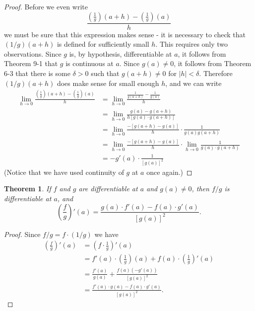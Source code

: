 \documentclass{article}
\newtheorem{theorem}{Theorem}
\begin{document}
\begin{proof}
  Before we even write \begin{equation*}
    \frac{\left(\frac{1}{g}\right)(a + h) - \left(\frac{1}{g}\right)(a)}{h}
  \end{equation*} we must be sure that this expression makes sense - it is
  necessary to check that $(1/g)(a + h)$ is defined for sufficiently small $h$.
  This requires only two observations. Since $g$ is, by hypothesis,
  differentiable at $a$, it follows from Theorem 9-1 that $g$ is continuous at
  $a$. Since $g(a) \neq 0$, it follows from Theorem 6-3 that there is some
  $\delta > 0$ such that $g(a + h) \neq 0$ for $|h| < \delta$. Therefore $(1/g)
  (a + h)$ does make sense for small enough $h$, and we can write
  \begin{align*}
    \lim_{h \rightarrow 0}\frac{\left(\frac{1}{g}\right)(a + h) - \left(\frac
    {1}{g}\right)(a)}{h}
      &= \lim_{h \rightarrow 0}\frac{\frac{1}{g(a + h)} - \frac{1}{g(a)}}{h} \\
      &= \lim_{h \rightarrow 0}\frac{g(a) - g(a + h)}{h[g(a) \cdot g(a + h)]}
        \\
      &= \lim_{h \rightarrow 0}{\frac{-[g(a + h) - g(a)]}{h} \cdot \frac{1}
        {g(a)g(a + h)}} \\
      &= \lim_{h \rightarrow 0}{\frac{-[g(a + h) - g(a)]}{h} \cdot \lim_{h
        \rightarrow 0}\frac{1}{g(a) \cdot g(a + h)}} \\
      &= -g'(a) \cdot \frac{1}{[g(a)]^2}
  \end{align*}
  (Notice that we have used continuity of $g$ at $a$ once again.)
\end{proof}

\begin{theorem}
  If $f$ and $g$ are differentiable at $a$ and $g(a) \neq 0$, then $f/g$ is
  differentiable at $a$, and \begin{equation*}
    \left(\frac{f}{g}\right)'(a) = \frac{g(a) \cdot f'(a) - f(a) \cdot g'(a)}
      {[g(a)]^2}.
  \end{equation*}
\end{theorem}

\begin{proof}
  Since $f/g = f \cdot (1/g)$ we have \begin{align*}
    \left(\frac{f}{g}\right)'(a) &= \left(f \cdot \frac{1}{g}\right)'(a) \\
      &= f'(a) \cdot \left(\frac{1}{g}\right)(a) + f(a) \cdot \left(\frac{1}{g}
        \right)'(a) \\
      &= \frac{f'(a)}{g(a)} + \frac{f(a)(-g'(a))}{[g(a)]^2} \\
      &= \frac{f'(a) \cdot g(a) - f(a) \cdot g'(a)}{[g(a)]^2}.
  \end{align*}
\end{proof}
\end{document}
